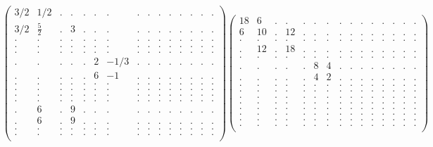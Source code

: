 \documentclass[12pt,a4paper]{amsart}
\begin{document}
\begin{align*}
\left(\begin{array}{rrrrrrrrrrrrrrr}%
3/2&1/2&.&.&.&.&.&.&.&.&.&.&.&.&.\\%
3/2&\frac{5}{2}&.&3&.&.&.&.&.&.&.&.&.&.&.\\%
.&.&.&.&.&.&.&.&.&.&.&.&.&.&.\\%
.&.&.&.&.&.&.&.&.&.&.&.&.&.&.\\%
.&.&.&.&.&.&.&.&.&.&.&.&.&.&.\\%
.&.&.&.&.&2&-1/3&.&.&.&.&.&.&.&.\\%
.&.&.&.&.&6&-1&.&.&.&.&.&.&.&.\\%
.&.&.&.&.&.&.&.&.&.&.&.&.&.&.\\%
.&.&.&.&.&.&.&.&.&.&.&.&.&.&.\\%
.&.&.&.&.&.&.&.&.&.&.&.&.&.&.\\%
.&.&.&.&.&.&.&.&.&.&.&.&.&.&.\\%
.&6&.&9&.&.&.&.&.&.&.&.&.&.&.\\%
.&6&.&9&.&.&.&.&.&.&.&.&.&.&.\\%
.&.&.&.&.&.&.&.&.&.&.&.&.&.&.\\%
.&.&.&.&.&.&.&.&.&.&.&.&.&.&.\\%
\end{array}\right)%
\left(\begin{array}{rrrrrrrrrrrrrrr}%
18&6&.&.&.&.&.&.&.&.&.&.&.&.&.\\%
6&10&.&12&.&.&.&.&.&.&.&.&.&.&.\\%
.&.&.&.&.&.&.&.&.&.&.&.&.&.&.\\%
.&12&.&18&.&.&.&.&.&.&.&.&.&.&.\\%
.&.&.&.&.&.&.&.&.&.&.&.&.&.&.\\%
.&.&.&.&.&8&4&.&.&.&.&.&.&.&.\\%
.&.&.&.&.&4&2&.&.&.&.&.&.&.&.\\%
.&.&.&.&.&.&.&.&.&.&.&.&.&.&.\\%
.&.&.&.&.&.&.&.&.&.&.&.&.&.&.\\%
.&.&.&.&.&.&.&.&.&.&.&.&.&.&.\\%
.&.&.&.&.&.&.&.&.&.&.&.&.&.&.\\%
.&.&.&.&.&.&.&.&.&.&.&.&.&.&.\\%
.&.&.&.&.&.&.&.&.&.&.&.&.&.&.\\%
.&.&.&.&.&.&.&.&.&.&.&.&.&.&.\\%
.&.&.&.&.&.&.&.&.&.&.&.&.&.&.\\%
\end{array}\right)%
\end{align*}
\end{document}
